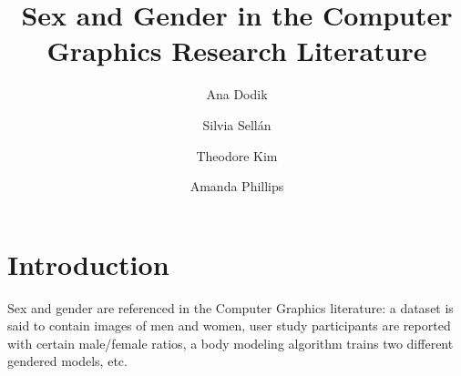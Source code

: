 \documentclass[sigconf,balance=false]{acmart}
\begin{document}
\title{Sex and Gender in the Computer Graphics Research Literature}

\author{Ana Dodik}

\author{Silvia Sellán}\authornotemark[1]

\author{Theodore Kim}

\author{Amanda Phillips}





\maketitle

\section{Introduction}


Sex and gender are referenced in the Computer Graphics literature: a dataset is said to contain images of men and women, user study participants are reported with certain male/female ratios, a body modeling algorithm trains two different gendered models, etc.

\end{document}
